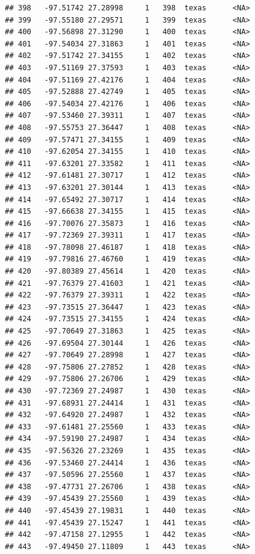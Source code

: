 \documentclass[
]{article}
\begin{document}
\begin{verbatim}
## 398   -97.51742 27.28998     1   398  texas      <NA>
## 399   -97.55180 27.29571     1   399  texas      <NA>
## 400   -97.56898 27.31290     1   400  texas      <NA>
## 401   -97.54034 27.31863     1   401  texas      <NA>
## 402   -97.51742 27.34155     1   402  texas      <NA>
## 403   -97.51169 27.37593     1   403  texas      <NA>
## 404   -97.51169 27.42176     1   404  texas      <NA>
## 405   -97.52888 27.42749     1   405  texas      <NA>
## 406   -97.54034 27.42176     1   406  texas      <NA>
## 407   -97.53460 27.39311     1   407  texas      <NA>
## 408   -97.55753 27.36447     1   408  texas      <NA>
## 409   -97.57471 27.34155     1   409  texas      <NA>
## 410   -97.62054 27.34155     1   410  texas      <NA>
## 411   -97.63201 27.33582     1   411  texas      <NA>
## 412   -97.61481 27.30717     1   412  texas      <NA>
## 413   -97.63201 27.30144     1   413  texas      <NA>
## 414   -97.65492 27.30717     1   414  texas      <NA>
## 415   -97.66638 27.34155     1   415  texas      <NA>
## 416   -97.70076 27.35873     1   416  texas      <NA>
## 417   -97.72369 27.39311     1   417  texas      <NA>
## 418   -97.78098 27.46187     1   418  texas      <NA>
## 419   -97.79816 27.46760     1   419  texas      <NA>
## 420   -97.80389 27.45614     1   420  texas      <NA>
## 421   -97.76379 27.41603     1   421  texas      <NA>
## 422   -97.76379 27.39311     1   422  texas      <NA>
## 423   -97.73515 27.36447     1   423  texas      <NA>
## 424   -97.73515 27.34155     1   424  texas      <NA>
## 425   -97.70649 27.31863     1   425  texas      <NA>
## 426   -97.69504 27.30144     1   426  texas      <NA>
## 427   -97.70649 27.28998     1   427  texas      <NA>
## 428   -97.75806 27.27852     1   428  texas      <NA>
## 429   -97.75806 27.26706     1   429  texas      <NA>
## 430   -97.72369 27.24987     1   430  texas      <NA>
## 431   -97.68931 27.24414     1   431  texas      <NA>
## 432   -97.64920 27.24987     1   432  texas      <NA>
## 433   -97.61481 27.25560     1   433  texas      <NA>
## 434   -97.59190 27.24987     1   434  texas      <NA>
## 435   -97.56326 27.23269     1   435  texas      <NA>
## 436   -97.53460 27.24414     1   436  texas      <NA>
## 437   -97.50596 27.25560     1   437  texas      <NA>
## 438   -97.47731 27.26706     1   438  texas      <NA>
## 439   -97.45439 27.25560     1   439  texas      <NA>
## 440   -97.45439 27.19831     1   440  texas      <NA>
## 441   -97.45439 27.15247     1   441  texas      <NA>
## 442   -97.47158 27.12955     1   442  texas      <NA>
## 443   -97.49450 27.11809     1   443  texas      <NA>

\end{verbatim}
\end{document}
